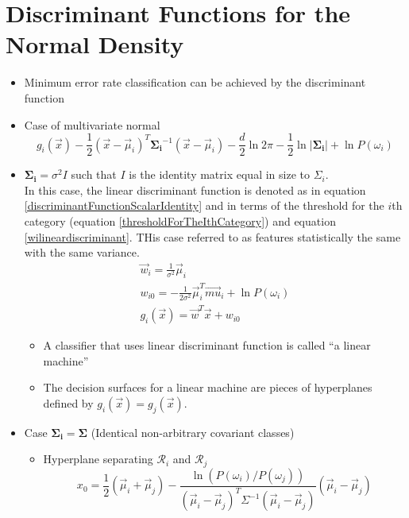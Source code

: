 \documentclass[11pt]{article}
\begin{document}
\section{Discriminant Functions for the Normal Density}
\begin{itemize}
	\item Minimum error rate classification can be achieved by the discriminant function
	\item Case of multivariate normal 
	\begin{equation}
		g_i (\vec{x}) -\frac{1}{2}(\vec{x} - \vec{\mu}_i) ^T \mathbf{\Sigma_i} ^{-1} (\vec{x} - \vec{\mu}_i) - \frac{d}{2} \ln 2\pi - \frac{1}{2} \ln |\mathbf{\Sigma_i} | + \ln P(\omega_i) \label{noramlDenistyMultivariate}
	\end{equation}
	\item $\mathbf{\Sigma_i} = \sigma^2 I$  such that $I$ is the identity matrix equal in size to $\Sigma_i$.  \\
	In this case, the linear discriminant function is denoted as in equation \ref{discriminantFunctionScalarIdentity} and in terms of the threshold for the $i$th category (equation \ref{thresholdForTheIthCategory}) and equation \ref{wilineardiscriminant}.  THis case referred to as features statistically the same with the same variance.
	\begin{eqnarray}
	\vec{w}_i = \frac{1}{\sigma^2} \vec{\mu} _i \label{wilineardiscriminant} \\
	w_{i0} = -\frac{1}{2\sigma ^2} \vec{\mu}_i ^T \vec{mu}_i + \ln P(\omega_i)  \label{thresholdForTheIthCategory} \\
	g_i (\vec{x}) = \vec{w}^T \vec{x} + w_{i0} \label{discriminantFunctionScalarIdentity}
	\end{eqnarray}
	\begin{itemize}
		\item A classifier that uses linear discriminant function is called ``a linear machine''
		\item The decision surfaces for a linear machine are pieces of hyperplanes defined by $g_i(\vec{x}) =
	 g_j(\vec{x})$.
	\end{itemize}
	\item Case $\mathbf{\Sigma_i} = \mathbf{\Sigma}$ (Identical non-arbitrary covariant classes)
	\begin{itemize}
		\item Hyperplane separating $\mathcal{R}_i$ and $\mathcal{R}_j$
		\begin{equation}
			x_0 = \frac{1}{2}(\vec{\mu} _i + \vec{\mu} _j) - \frac{\ln (P(\omega_i) / P(\omega_j))}{(\vec{\mu} _i - \vec{\mu} _j) ^T \Sigma^{-1} (\vec{\mu}_i - \vec{\mu} _j)  } (\vec{\mu} _i - \vec{\mu} _j) \label{hyperPlaneDerivedFromDiscriminant}

\end{equation}
\end{itemize}
\end{itemize}
\end{document}
